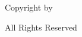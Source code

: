 \documentclass{article}
\begin{document}
\begin{centering}

\vspace*{0.3333\textheight}

\textcopyright Copyright by \ThesisAuthor\par
\DefenseDate\par
All Rights Reserved

\end{centering}
\end{document}
